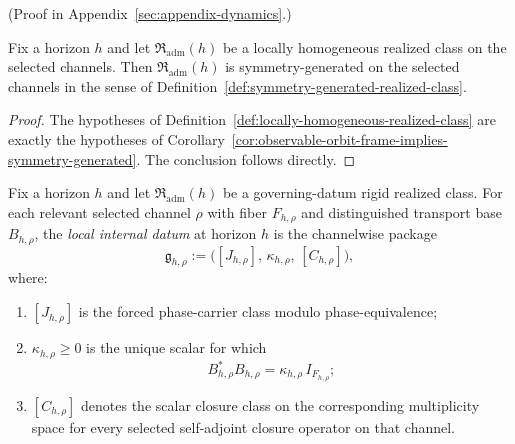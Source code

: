 (Proof in Appendix~\ref{sec:appendix-dynamics}.)

\begin{corollary}
\label{cor:locally-homogeneous-implies-symmetry-generated}
Fix a horizon $h$ and let $\mathfrak R_{\mathrm{adm}}(h)$ be a locally
homogeneous realized class on the selected channels. Then
$\mathfrak R_{\mathrm{adm}}(h)$ is symmetry-generated on the selected channels
in the sense of Definition~\ref{def:symmetry-generated-realized-class}.
\end{corollary}

\begin{proof}
The hypotheses of
Definition~\ref{def:locally-homogeneous-realized-class} are exactly the
hypotheses of
Corollary~\ref{cor:observable-orbit-frame-implies-symmetry-generated}. The
conclusion follows directly.
\end{proof}

\begin{definition}
\label{def:local-internal-datum-selected-channels}
Fix a horizon $h$ and let $\mathfrak R_{\mathrm{adm}}(h)$ be a governing-datum
rigid realized class. For each relevant selected channel
$\rho$ with fiber $F_{h,\rho}$ and distinguished transport base $B_{h,\rho}$,
the \emph{local internal datum} at horizon $h$ is the channelwise package
\[
\mathfrak g_{h,\rho}:=\bigl([J_{h,\rho}],\,\kappa_{h,\rho},\,[C_{h,\rho}]\bigr),
\]
where:
\begin{enumerate}[label=(\roman*), leftmargin=2em, itemsep=0.2em]
\item $[J_{h,\rho}]$ is the forced phase-carrier class modulo
      phase-equivalence;
\item $\kappa_{h,\rho}\ge 0$ is the unique scalar for which
      \[
      B_{h,\rho}^*B_{h,\rho}=\kappa_{h,\rho}\,I_{F_{h,\rho}};
      \]
\item $[C_{h,\rho}]$ denotes the scalar closure class on the corresponding
      multiplicity space for every selected self-adjoint closure operator on
      that channel.
\end{enumerate}
\end{definition}

